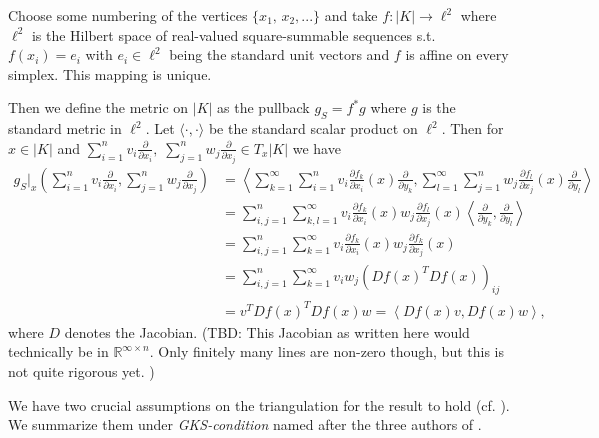 \documentclass[12pt,a4paper]{article}
\theoremstyle{definition}
\newcommand{\real}{\mathbb{R}}
\begin{document}
Choose some numbering of the vertices $\{ x_1,\, x_2, ... \}$ and
take $f: |K| \rightarrow \ell^2$ where $\ell^2$ is the 
Hilbert space of real-valued square-summable sequences s.t. $f(x_i) = e_i$ 
with $e_i \in \ell^2$ being the standard unit vectors and $f$ is affine on 
every simplex. This mapping is unique.%

Then we define the metric on $|K|$ as the pullback $g_S = f^*g$ 
where $g$ is the standard metric in $\ell^2$. Let $\langle \cdot , 
\cdot \rangle$ be the standard scalar product on $\ell^2$. Then for $x \in |K|$ 
and $\sum_{i=1}^n v_i \frac{\partial}{\partial x_i}, \; 
\sum_{j=1}^n w_j \frac{\partial}{\partial x_j} \in T_x |K|$ we have 
\begin{align*}
g_S|_x\left(\sum_{i=1}^n v_i \frac{\partial}{\partial x_i}, 
\sum_{j=1}^n w_j \frac{\partial}{\partial x_j}\right) &= 
\left\langle \sum_{k=1}^\infty \sum_{i=1}^n v_i 
\frac{\partial f_k}{\partial x_i} (x)
\frac{\partial }{\partial y_k}, 
\sum_{l=1}^\infty \sum_{j=1}^n w_j \frac{\partial f_l}{\partial x_j} (x)
\frac{\partial }{\partial y_l} \right\rangle \\   
&= \sum_{i,j=1}^n \sum_{k,l=1}^\infty v_i \frac{\partial f_k}{\partial x_i} (x)
w_j \frac{\partial f_l}{\partial x_j} (x) 
\left\langle \frac{\partial }{\partial y_k}, \frac{\partial }{\partial y_l} 
\right\rangle\\
&= \sum_{i,j=1}^n \sum_{k=1}^\infty v_i \frac{\partial f_k}{\partial x_i} (x)
w_j \frac{\partial f_k}{\partial x_j} (x)\\
&= \sum_{i,j=1}^n \sum_{k=1}^\infty v_i w_j \left( Df(x)^T Df(x) \right)_{ij} \\
&= v^T Df(x)^T Df(x) w = \left\langle Df(x) v, Df(x) w \right\rangle,
\end{align*}
where $D$ denotes the Jacobian. 
{\color{red} (TBD: This Jacobian as written here would technically be in 
$\real^{\infty \times n}$. Only finitely many lines are non-zero though, 
but this is not quite rigorous yet. )}

We have two crucial assumptions on the triangulation for the result to hold 
(cf. \cite[p.194]{goldshtein}). We summarize them under 
\textit{GKS-condition} named after the three authors of \cite{goldshtein}.
\end{document}
